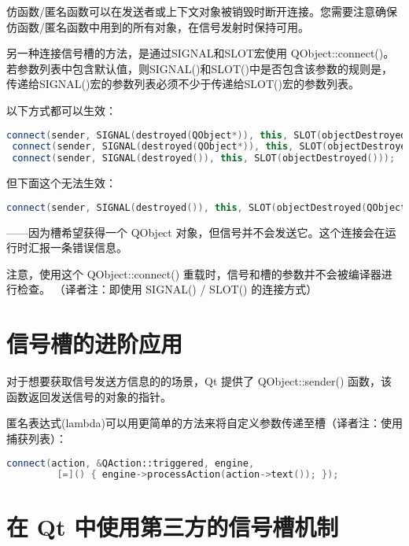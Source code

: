 仿函数/匿名函数可以在发送者或上下文对象被销毁时断开连接。您需要注意确保仿函数/匿名函数中用到的所有对象，在信号发射时保持可用。

另一种连接信号槽的方法，是通过SIGNAL和SLOT宏使用 QObject::connect()。
若参数列表中包含默认值，则SIGNAL()和SLOT()中是否包含该参数的规则是，
传递给SIGNAL()宏的参数列表必须不少于传递给SLOT()宏的参数列表。

以下方式都可以生效：

\begin{lstlisting}[language=C++]
 connect(sender, SIGNAL(destroyed(QObject*)), this, SLOT(objectDestroyed(Qbject*)));
 connect(sender, SIGNAL(destroyed(QObject*)), this, SLOT(objectDestroyed()));
 connect(sender, SIGNAL(destroyed()), this, SLOT(objectDestroyed()));
\end{lstlisting}

但下面这个无法生效：

\begin{lstlisting}[language=C++]
connect(sender, SIGNAL(destroyed()), this, SLOT(objectDestroyed(QObject*)));
\end{lstlisting}

——因为槽希望获得一个 QObject 对象，但信号并不会发送它。这个连接会在运行时汇报一条错误信息。

\begin{notice}
注意，使用这个 QObject::connect() 重载时，信号和槽的参数并不会被编译器进行检查。
（译者注：即使用 SIGNAL() / SLOT() 的连接方式）
\end{notice}

\section{信号槽的进阶应用}

对于想要获取信号发送方信息的的场景，Qt 提供了 QObject::sender() 函数，该函数返回发送信号的对象的指针。

匿名表达式(lambda)可以用更简单的方法来将自定义参数传递至槽（译者注：使用捕获列表）：

\begin{lstlisting}[language=C++]
connect(action, &QAction::triggered, engine,
         [=]() { engine->processAction(action->text()); });
\end{lstlisting}


\section{在 Qt 中使用第三方的信号槽机制}


